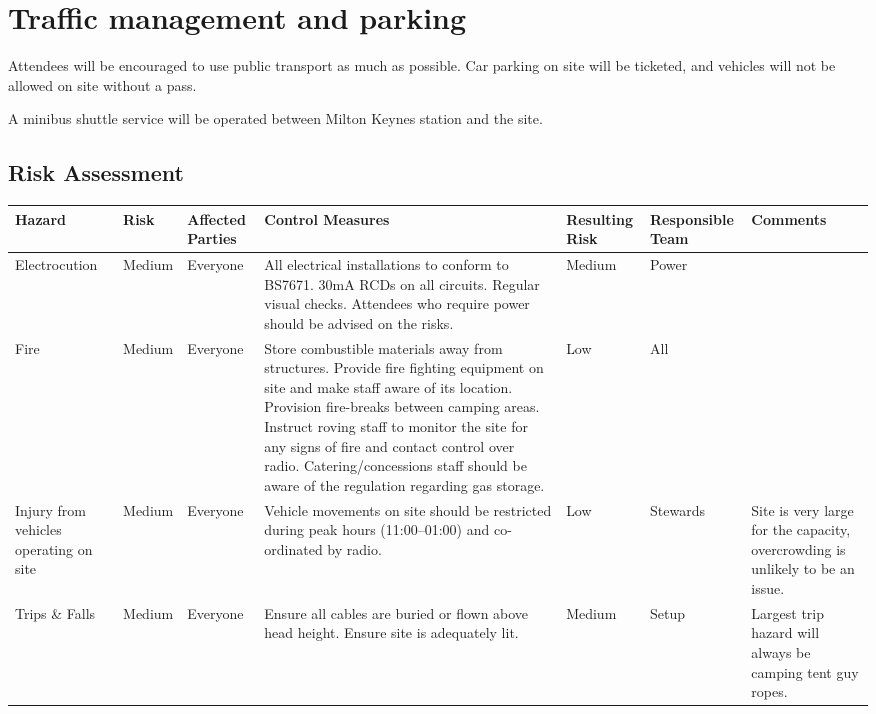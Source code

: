 \section{Traffic management and parking}

Attendees will be encouraged to use public transport as much as possible. Car parking on site will be ticketed,
and vehicles will not be allowed on site without a pass.

A minibus shuttle service will be operated between Milton Keynes station and the site.
\begin{landscape}
\section{Risk Assessment}
\begin{tabular}{ | p{3cm} | l | p{1.5cm} | p{8cm} | p{1.5cm} | p{2cm} | p{5cm} | }
\hline
\textbf{Hazard} & \textbf{Risk} & \textbf{Affected Parties}
& \textbf{Control Measures} & \textbf{Resulting Risk} & \textbf{Responsible Team} & \textbf{Comments} \\ \hline

Electrocution & Medium & Everyone & 
All electrical installations to conform to BS7671. 30mA RCDs on all circuits.
Regular visual checks. Attendees who require power should be advised on the risks. &
Medium & Power & \\ \hline

Fire & Medium & Everyone &
Store combustible materials away from structures.
Provide fire fighting equipment on site and make staff aware of its location.
Provision fire-breaks between camping areas.
Instruct roving staff to monitor the site for any signs of fire and contact control over radio.
Catering/concessions staff should be aware of the regulation regarding gas storage. &
Low & All & \\ \hline

Injury from vehicles operating on site & Medium & Everyone &
Vehicle movements on site should be restricted during peak hours
(11:00--01:00) and co-ordinated by radio. &
Low & Stewards & Site is very large for the capacity, overcrowding is unlikely to be an issue. \\ \hline

Trips \& Falls & Medium & Everyone &
Ensure all cables are buried or flown above head height. Ensure site is adequately lit. &
Medium & Setup & Largest trip hazard will always be camping tent guy ropes. \\ \hline


\end{tabular}
\end{landscape}
